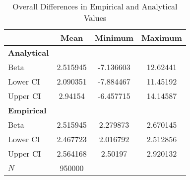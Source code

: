 \begin{table}[htbp]\centering
\def\sym#1{\ifmmode^{#1}\else\(^{#1}\)\fi}
\caption{Overall Differences in Empirical and Analytical Values}
\begin{tabular}{l*{1}{ccc}}
\hline\hline
            &        Mean&     Minimum&     Maximum\\
\hline
\textbf{Analytical}&            &            &            \\
Beta        &    2.515945&   -7.136603&    12.62441\\
Lower CI    &    2.090351&   -7.884467&    11.45192\\
Upper CI    &     2.94154&   -6.457715&    14.14587\\
\hline \textbf{Empirical}&            &            &            \\
Beta        &    2.515945&    2.279873&    2.670145\\
Lower CI    &    2.467723&    2.016792&    2.512856\\
Upper CI    &    2.564168&     2.50197&    2.920132\\
\hline
\(N\)       &      950000&            &            \\
\hline\hline
\end{tabular}
\end{table}
